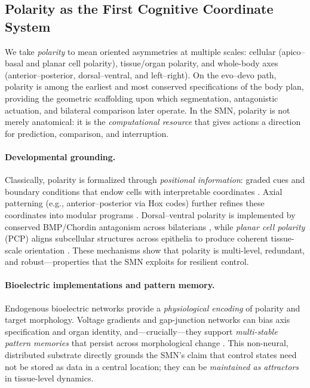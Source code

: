 
\subsection{Polarity as the First Cognitive Coordinate System}
\label{subsec:polarity}

We take \emph{polarity} to mean oriented asymmetries at multiple scales: cellular (apico--basal and planar cell polarity), tissue/organ polarity, and whole-body axes (anterior--posterior, dorsal--ventral, and left--right).
On the evo--devo path, polarity is among the earliest and most conserved specifications of the body plan, providing the geometric scaffolding upon which segmentation, antagonistic actuation, and bilateral comparison later operate.
In the SMN, polarity is not merely anatomical: it is the \emph{computational resource} that gives actions a direction for prediction, comparison, and interruption.

\paragraph{Developmental grounding.}
Classically, polarity is formalized through \emph{positional information}: graded cues and boundary conditions that endow cells with interpretable coordinates \cite{Wolpert1969PositionalInformation}.
Axial patterning (e.g., anterior--posterior via Hox codes) further refines these coordinates into modular programs \cite{McGinnisKrumlauf1992Hox}.
Dorsal--ventral polarity is implemented by conserved BMP/Chordin antagonism across bilaterians \cite{DeRobertisSasai1996CommonPlan}, while \emph{planar cell polarity} (PCP) aligns subcellular structures across epithelia to produce coherent tissue-scale orientation \cite{GoodrichStrutt2011PCP}.
These mechanisms show that polarity is multi-level, redundant, and robust---properties that the SMN exploits for resilient control.

\paragraph{Bioelectric implementations and pattern memory.}
Endogenous bioelectric networks provide a \emph{physiological encoding} of polarity and target morphology.
Voltage gradients and gap-junction networks can bias axis specification and organ identity, and---crucially---they support \emph{multi-stable pattern memories} that persist across morphological change \cite{Levin2012MorphogeneticFields,Levin2014MolecularBioelectricity}.
This non-neural, distributed substrate directly grounds the SMN's claim that control states need not be stored as data in a central location; they can be \emph{maintained as attractors} in tissue-level dynamics.

